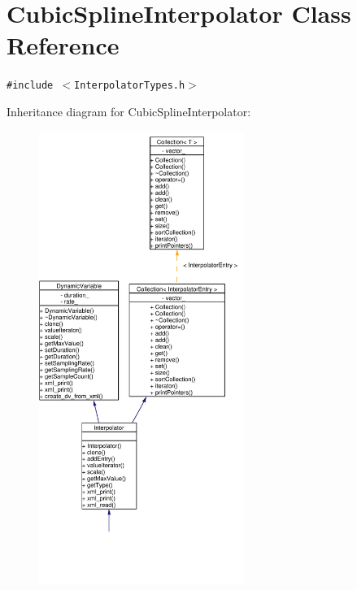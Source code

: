 \hypertarget{classCubicSplineInterpolator}{
\section{Cubic\-Spline\-Interpolator Class Reference}
\label{classCubicSplineInterpolator}
}
{\tt \#include $<$Interpolator\-Types.h$>$}

Inheritance diagram for Cubic\-Spline\-Interpolator:\begin{figure}[H]
\begin{center}
\leavevmode
\includegraphics[width=189pt]{classCubicSplineInterpolator__inherit__graph}
\end{center}
\end{figure}
